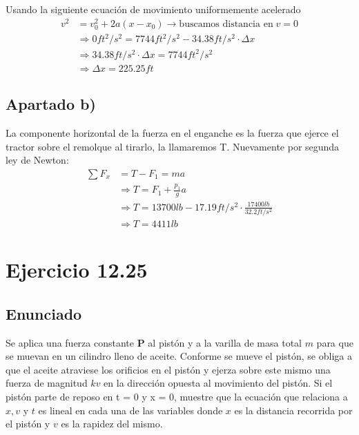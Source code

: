\documentclass[11pt]{article}
\begin{document}
Usando la siguiente ecuación de movimiento uniformemente acelerado
\begin{align*}
  v^2 &= v^2_0 +2a(x-x_0) \rightarrow \text{buscamos distancia en} \; v = 0 \\
      &\Rightarrow 0ft^2/s^2 = 7744ft^2/s^2 - 34.38ft/s^2 \cdot \Delta x \\
      &\Rightarrow 34.38ft/s^2 \cdot \Delta x = 7744ft^2/s^2 \\
      &\Rightarrow \Delta x = 225.25ft
\end{align*}

\subsection*{Apartado b)}

La componente horizontal de la fuerza en el enganche es la fuerza que ejerce
el tractor sobre el remolque al tirarlo, la llamaremos T.
Nuevamente por segunda ley de Newton:
\begin{align*}
  \sum F_x &= T - F_1 = ma \\
           &\Rightarrow T = F_1 + \frac{p_1}{g}a \\
           &\Rightarrow T = 13700lb - 17.19ft/s^2 \cdot \frac{17400lb}{32.2ft/s^2} \\
           &\Rightarrow T = 4411lb
\end{align*}


\section*{Ejercicio 12.25}

\subsection*{Enunciado}

Se aplica una fuerza constante \textbf{P} al pistón y a la varilla de masa total
$m$ para que se muevan en un cilindro lleno de aceite. Conforme se mueve el
pistón, se obliga a que el aceite atraviese los orificios en el pistón y ejerza
sobre este mismo una fuerza de magnitud $kv$ en la dirección opuesta al
movimiento del pistón. Si el pistón parte de reposo en t = 0 y x = 0, muestre
que la ecuación que relaciona a $x, v$ y $t$ es lineal en cada una de las
variables donde $x$ es la distancia recorrida por el pistón y $v$ es la rapidez
del mismo.
\end{document}
